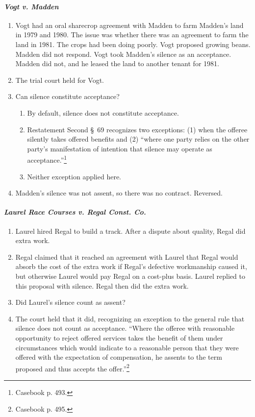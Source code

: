 \paragraph{\emph{Vogt v. Madden}}

\begin{enumerate}
    \item Vogt had an oral sharecrop agreement with Madden to farm Madden's 
    land in 1979 and 1980. The issue was whether there was an agreement to 
    farm the land in 1981. The crops had been doing poorly. Vogt proposed 
    growing beans. Madden did not respond. Vogt took Madden's silence as an 
    acceptance. Madden did not, and he leased the land to another tenant for 
    1981.
    \item The trial court held for Vogt.
    \item Can silence constitute acceptance?
    \begin{enumerate}
        \item By default, silence does not constitute acceptance.
        \item Restatement Second \S\ 69 recognizes two exceptions: (1) when 
        the offeree silently takes offered benefits and (2) ``where one party 
        relies on the other party's manifestation of intention that silence 
        may operate as acceptance.''\footnote{Casebook p. 493.}
        \item Neither exception applied here.
    \end{enumerate}
    \item Madden's silence was not assent, so there was no contract. Reversed.
\end{enumerate}

\paragraph{\emph{Laurel Race Courses v. Regal Const. Co.}}

\begin{enumerate}
    \item Laurel hired Regal to build a track. After a dispute about quality, 
    Regal did extra work.
    \item Regal claimed that it reached an agreement with Laurel that Regal 
    would absorb the cost of the extra work if Regal's defective workmanship 
    caused it, but otherwise Laurel would pay Regal on a cost-plus basis. 
    Laurel replied to this proposal with silence. Regal then did the extra work.
    \item Did Laurel's silence count as assent?
    \item The court held that it did, recognizing an exception to the general 
    rule that silence does not count as acceptance. ``Where the offeree with 
    reasonable opportunity to reject offered services takes the benefit of 
    them under circumstances which would indicate to a reasonable person that 
    they were offered with the expectation of compensation, he assents to the 
    term proposed and thus accepts the offer.''\footnote{Casebook p. 495.}
\end{enumerate}

